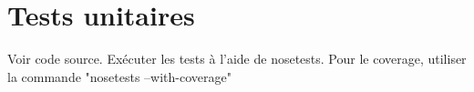 \chapter{Tests unitaires}

Voir code source.
Exécuter les tests à l'aide de nosetests.
Pour le coverage, utiliser la commande "nosetests --with-coverage"

